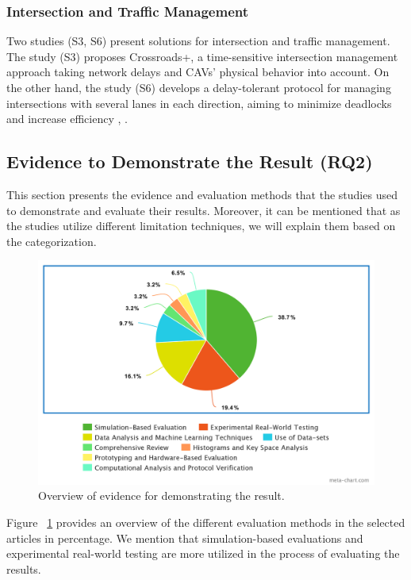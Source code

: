 \documentclass[a4paper,12pt]{article}
\begin{document}
\subsubsection{Intersection and Traffic Management}
\hspace{5mm} Two studies (S3, S6) present solutions for intersection and traffic management. The study (S3) proposes Crossroads+, a time-sensitive intersection management approach taking network delays and CAVs' physical behavior into account. On the other hand, the study (S6) develops a delay-tolerant protocol for managing intersections with several lanes in each direction, aiming to minimize deadlocks and increase efficiency \cite{s3}, \cite{s6}.

\newpage

\subsection{Evidence to Demonstrate the Result (RQ2)}
\hspace{5mm} This section presents the evidence and evaluation methods that the studies used to demonstrate and evaluate their results. Moreover, it can be mentioned that as the studies utilize different limitation techniques, we will explain them based on the categorization.


\begin{figure}[H]
  \centering
  \includegraphics*[width=1.1\columnwidth]{img/Overview of evidence for demonstrating the result}
  \caption{Overview of evidence for demonstrating the result.}   \label{fig:Overview of evidence for demonstrating the result}
\end{figure}

Figure ~\ref{fig:Overview of evidence for demonstrating the result} provides an overview of the different evaluation methods in the selected articles in percentage. We mention that simulation-based evaluations and experimental real-world testing are more utilized in the process of evaluating the results.
\end{document}

